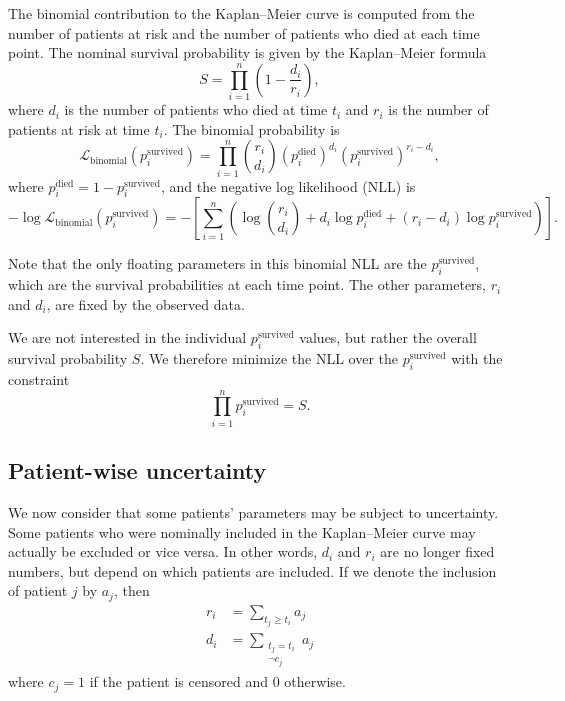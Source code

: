 \documentclass[article]{jss}
\begin{document}
The binomial contribution to the Kaplan--Meier curve is computed from the number of patients at risk and the number of patients who died at each time point.  The nominal survival probability is given by the Kaplan--Meier formula
\begin{equation}
S = \prod_{i=1}^{n} \left(1 - \frac{d_i}{r_i}\right), \label{eq:km-probability}
\end{equation}
where \(d_i\) is the number of patients who died at time \(t_i\) and \(r_i\) is the number of patients at risk at time \(t_i\).  The binomial probability is
\begin{equation}
\mathcal{L}_{\text{binomial}}(p_i^\text{survived}) = \prod_{i=1}^{n} \binom{r_i}{d_i} \left(p_i^\text{died}\right)^{d_i} \left(p_i^\text{survived}\right)^{r_i-d_i},
\end{equation}
where \(p_i^\text{died} = 1 - p_i^\text{survived}\), and the negative log likelihood (NLL) is
\begin{equation}
-\log \mathcal{L}_{\text{binomial}}(p_i^\text{survived}) = -\left[\sum_{i=1}^{n} \left( \log\binom{r_i}{d_i} + d_i \log p_i^\text{died} + (r_i-d_i) \log p_i^\text{survived} \right)\right].
\end{equation}

Note that the only floating parameters in this binomial NLL are the \(p_i^\text{survived}\), which are the survival probabilities at each time point.  The other parameters, \(r_i\) and \(d_i\), are fixed by the observed data.

We are not interested in the individual \(p_i^\text{survived}\) values, but rather the overall survival probability \(S\).  We therefore minimize the NLL over the \(p_i^\text{survived}\) with the constraint
\begin{equation}
\prod_{i=1}^{n} p_i^\text{survived} = S. \label{eq:km-probability-constraint}
\end{equation}

\subsection{Patient-wise uncertainty}

We now consider that some patients' parameters may be subject to uncertainty.  Some patients who were nominally included in the Kaplan--Meier curve may actually be excluded or vice versa.  In other words, \(d_i\) and \(r_i\) are no longer fixed numbers, but depend on which patients are included.  If we denote the inclusion of patient \(j\) by \(a_j\), then
\begin{align}
r_i &= \sum_{t_j \geq t_i} a_j \\
d_i &= \sum_{\substack{t_j = t_i \\ \neg c_j}} a_j
\end{align}
where \(c_j=1\) if the patient is censored and \(0\) otherwise.
\end{document}
